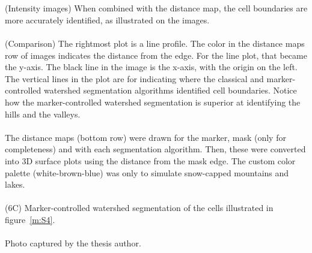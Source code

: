 \begin{centering}
{\\
\\
(Intensity images) When combined with the distance map, the cell boundaries are more accurately identified, as illustrated on the images.
\\
\\
(Comparison) The rightmost plot is a line profile. The color in the distance maps row of images indicates the distance from the edge. For the line plot, that became the y-axis. The black line in the image is the x-axis, with the origin on the left. The vertical lines in the plot are for indicating where the classical and marker-controlled watershed segmentation algorithms identified cell boundaries. Notice how the marker-controlled watershed segmentation is superior at identifying the hills and the valleys.
\\
\\
The distance maps (bottom row) were drawn for the marker, mask (only for completeness) and with each segmentation algorithm. Then, these were converted into 3D surface plots using the distance from the mask edge. The custom color palette (white-brown-blue) was only to simulate snow-capped mountains and lakes.
\\
\\
(6C) Marker-controlled watershed segmentation of the cells illustrated in figure~\ref{m:S4}.
\\
\\
Photo captured by the thesis author.}
\label{m:S5}
\end{centering}


